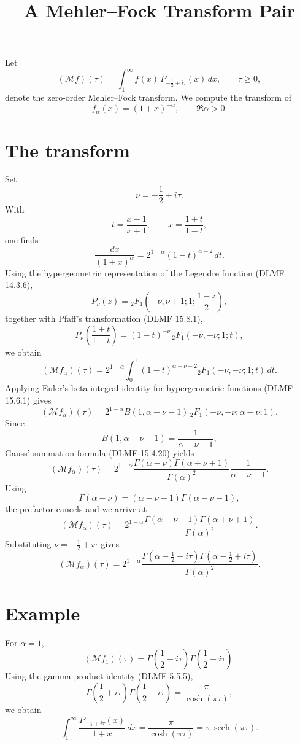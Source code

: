 \documentclass[11pt]{article}
\title{A Mehler--Fock Transform Pair} \author{} \date{}
\begin{document}
 
 	\maketitle 
 	Let \[ (\mathcal M f)(\tau) = \int_1^\infty f(x)\, P_{-\frac12+i\tau}(x)\,dx, \qquad \tau\ge 0, \] denote the zero-order Mehler--Fock transform. We compute the transform of \[ f_\alpha(x)=(1+x)^{-\alpha}, \qquad \Re \alpha>0. \] 
 	\section*{The transform} Set \[ \nu=-\frac12+i\tau. \] With \[ t=\frac{x-1}{x+1}, \qquad x=\frac{1+t}{1-t}, \] one finds \[ \frac{dx}{(1+x)^\alpha} = 2^{1-\alpha}(1-t)^{\alpha-2}\,dt. \] Using the hypergeometric representation of the Legendre function (DLMF 14.3.6), \[ P_\nu(z) = {}_2F_1\!\left( -\nu,\nu+1;1;\frac{1-z}{2} \right), \] together with Pfaff's transformation (DLMF 15.8.1), \[ P_\nu\!\left(\frac{1+t}{1-t}\right) = (1-t)^{-\nu} \,{}_2F_1(-\nu,-\nu;1;t), \] we obtain \[ (\mathcal M f_\alpha)(\tau) = 2^{1-\alpha} \int_0^1 (1-t)^{\alpha-\nu-2} {}_2F_1(-\nu,-\nu;1;t)\,dt. \] 
 	Applying Euler's beta-integral identity for hypergeometric functions (DLMF 15.6.1) gives \[ (\mathcal M f_\alpha)(\tau) = 2^{1-\alpha} B(1,\alpha-\nu-1) \,{}_2F_1(-\nu,-\nu;\alpha-\nu;1). \] Since \[ B(1,\alpha-\nu-1) = \frac1{\alpha-\nu-1}, \] Gauss' summation formula (DLMF 15.4.20) yields \[ (\mathcal M f_\alpha)(\tau) = 2^{1-\alpha} \frac{\Gamma(\alpha-\nu)\Gamma(\alpha+\nu+1)} {\Gamma(\alpha)^2} \frac1{\alpha-\nu-1}. \] Using \[ \Gamma(\alpha-\nu) = (\alpha-\nu-1)\Gamma(\alpha-\nu-1), \] the prefactor cancels and we arrive at \[ \boxed{ (\mathcal M f_\alpha)(\tau) = 2^{1-\alpha} \frac{ \Gamma(\alpha-\nu-1) \Gamma(\alpha+\nu+1) }{ \Gamma(\alpha)^2 }. } \] Substituting \( \nu=-\frac12+i\tau \) gives \[ \boxed{ (\mathcal M f_\alpha)(\tau) = 2^{1-\alpha} \frac{ \Gamma\!\left(\alpha-\frac12-i\tau\right) \Gamma\!\left(\alpha-\frac12+i\tau\right) }{ \Gamma(\alpha)^2 }. } \] 
 	
 	\section*{Example} For $\alpha=1$, \[ (\mathcal M f_1)(\tau) = \Gamma\!\left(\frac12-i\tau\right) \Gamma\!\left(\frac12+i\tau\right). \] Using the gamma-product identity (DLMF 5.5.5), \[ \Gamma\!\left(\frac12+i\tau\right) \Gamma\!\left(\frac12-i\tau\right) = \frac{\pi}{\cosh(\pi\tau)}, \] we obtain \[ \boxed{ \int_1^\infty \frac{ P_{-\frac12+i\tau}(x) }{ 1+x }\,dx = \frac{\pi}{\cosh(\pi\tau)} = \pi\,\operatorname{sech}(\pi\tau). } \] 
 	
\end{document}
